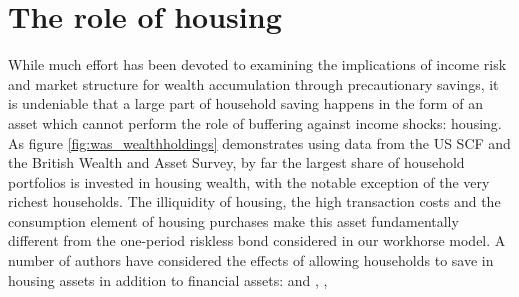 \section{The role of housing}\label{housing}
While much effort has been devoted to examining the implications of income risk
and market structure for wealth accumulation through precautionary savings, it 
is undeniable that a large part of household saving happens in the form of an
asset which cannot perform the role of buffering against income shocks: housing.
As figure \ref{fig:was_wealthholdings} demonstrates using data from the US SCF and
the British Wealth and Asset Survey, by far the largest share of household
portfolios is invested in housing wealth, with the notable exception of the
very richest households. The illiquidity of housing, the high transaction costs
and the consumption element of housing purchases make this asset fundamentally
different from the one-period riskless bond considered in our workhorse model.
A number of authors have considered the effects of allowing households to save
in housing assets in addition to financial assets: \citet{CampbellHercovitz2009} 
and \citet{CampbellHercovitz2005}, \citet{Yang2009}, \citet{Iacoviello2008}



